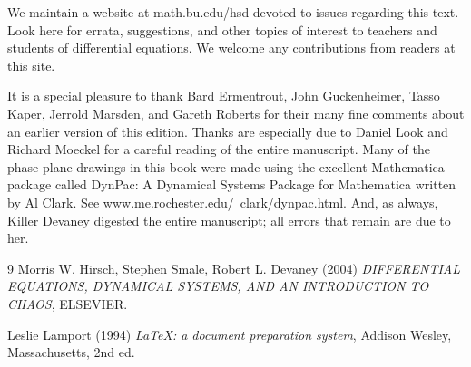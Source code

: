 \documentclass[12pt]{article}
\begin{document}
We maintain a website at math.bu.edu/hsd devoted to issues regarding
this text. Look here for errata, suggestions, and other topics of interest to
teachers and students of differential equations. We welcome any contributions
from readers at this site.

It is a special pleasure to thank Bard Ermentrout, John Guckenheimer, Tasso
Kaper, Jerrold Marsden, and Gareth Roberts for their many fine comments
about an earlier version of this edition. Thanks are especially due to Daniel
Look and Richard Moeckel for a careful reading of the entire manuscript.
Many of the phase plane drawings in this book were made using the excellent
Mathematica package called DynPac: A Dynamical Systems Package for Mathematica
written by Al Clark. See www.me.rochester.edu/~clark/dynpac.html.
And, as always, Killer Devaney digested the entire manuscript; all errors that
remain are due to her.

\begin{thebibliography}{9}
Morris W. Hirsch, Stephen Smale, Robert L. Devaney (2004) \emph{DIFFERENTIAL EQUATIONS,
DYNAMICAL SYSTEMS, AND
AN INTRODUCTION
TO CHAOS}, ELSEVIER.

Leslie Lamport (1994) \emph{\LaTeX: a document preparation system}, Addison
Wesley, Massachusetts, 2nd ed.
\end{thebibliography}
\end{document}
